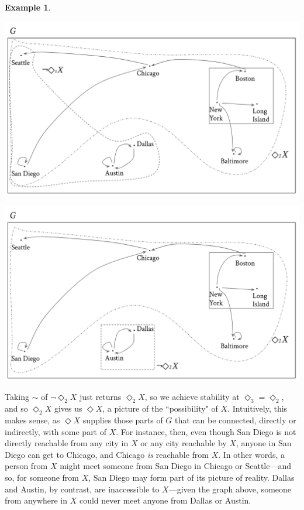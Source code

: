 \documentclass[11pt]{book}
\theoremstyle{definition}
\newtheorem{example}{Example}[section]
\theoremstyle{definition}
\theoremstyle{definition}
\theoremstyle{theorem}
\theoremstyle{definition}
\begin{document}
\begin{example}
\begin{center}
	\end{center}
	\begin{center}
		\includegraphics*[scale=0.2]{RoutesGraph7.png}
	\end{center}
	\begin{center}
		\includegraphics*[scale=0.2]{RoutesGraph8.png}
	\end{center}
	Taking $\sim$ of $\neg \Diamond_2 X$ just returns $\Diamond_2 X$, so we achieve stability at $\Diamond_3 = \Diamond_2$, and so $\Diamond_2 X$ gives us $\Diamond X$, a picture of the ``possibility" of $X$. Intuitively, this makes sense, as $\Diamond X$ supplies those parts of $G$ that can be connected, directly or indirectly, with some part of $X$. For instance, then, even though San Diego is not directly reachable from any city in $X$ or any city reachable by $X$, anyone in San Diego can get to Chicago, and Chicago \textit{is} reachable from $X$. In other words, a person from $X$ might meet someone from San Diego in Chicago or Seattle---and so, for someone from $X$, San Diego may form part of its picture of reality. Dallas and Austin, by contrast, are inaccessible to $X$---given the graph above, someone from anywhere in $X$ could never meet anyone from Dallas or Austin. \par    

\end{example}
\end{document}
